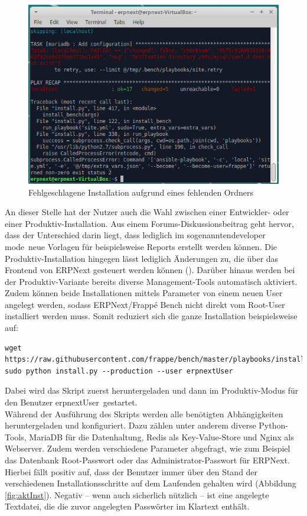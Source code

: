 \begin{figure}
  \centering
  \includegraphics[width=\textwidth]{Bilder/Fehlgeschlagene_Installation_2.PNG}
  \caption{Fehlgeschlagene Installation aufgrund eines fehlenden Ordners}
  \label{fig:fehlInst2}
\end{figure}
An dieser Stelle hat der Nutzer auch die Wahl zwischen einer Entwickler- oder einer Produktiv-Installation. Aus einem Forums-Diskussionsbeitrag geht hervor, dass der Unterschied darin liegt, dass lediglich im sogenannten\glqq developer mode\grqq\ neue Vorlagen für beispielsweise Reports erstellt werden können. Die Produktiv-Installation hingegen lässt lediglich Änderungen zu, die über das Frontend von ERPNext gesteuert werden können (\vgl \cite{ProdVsDev}). Darüber hinaus werden bei der Produktiv-Variante bereits diverse Management-Tools automatisch aktiviert. \\
Zudem können beide Installationen mittels Parameter von einem neuen User angelegt werden, sodass ERPNext/Frappé Bench nicht direkt vom Root-User installiert werden muss.
Somit reduziert sich die ganze Installation beispielsweise auf:
\begin{verbatim}
wget https://raw.githubusercontent.com/frappe/bench/master/playbooks/install.py
sudo python install.py --production --user erpnextUser
\end{verbatim}
Dabei wird das Skript zuerst heruntergeladen und dann im Produktiv-Modus für den Benutzer \glqq erpnextUser\grqq\ gestartet. \\
Während der Ausführung des Skripts werden alle benötigten Abhängigkeiten heruntergeladen und konfiguriert. Dazu zählen unter anderem diverse Python-Tools, MariaDB für die Datenhaltung, Redis als Key-Value-Store und Nginx als Webserver. Zudem werden verschiedene Parameter abgefragt, wie zum Beispiel das Datenbank Root-Passwort oder das Administrator-Passwort für ERPNext. Hierbei fällt positiv auf, dass der Benutzer immer über den Stand der verschiedenen Installationsschritte auf dem Laufenden gehalten wird (\vgl Abbildung \ref{fig:aktInst}). Negativ – wenn auch sicherlich nützlich – ist eine angelegte Textdatei, die die zuvor angelegten Passwörter im Klartext enthält.
